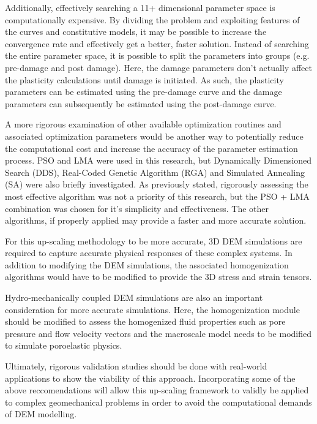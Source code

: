 Additionally, effectively searching a 11+ dimensional parameter space is computationally expensive. By dividing the problem and exploiting features of the curves and constitutive models, it may be possible to increase the convergence rate and effectively get a better, faster solution. Instead of searching the entire parameter space, it is possible to split the parameters into groups (e.g. pre-damage and post damage). Here, the damage parameters don't actually affect the plasticity calculations until damage is initiated. As such, the plasticity parameters can be estimated using the pre-damage curve and the damage parameters can subsequently be estimated using the post-damage curve.

A more rigorous examination of other available optimization routines and associated optimization parameters would be another way to potentially reduce the computational cost and increase the accuracy of the parameter estimation process. PSO and LMA were used in this research, but Dynamically Dimensioned Search (DDS), 
Real-Coded Genetic Algorithm (RGA) and Simulated Annealing (SA) were also briefly investigated. As previously stated, rigorously assessing the most effective algorithm was not a priority of this research, but the PSO + LMA combination was chosen for it's simplicity and effectiveness. The other algorithms, if properly applied may provide a faster and more accurate solution.
	
For this up-scaling methodology to be more accurate, 3D DEM simulations are required to capture accurate physical responses of these complex systems. In addition to modifying the DEM simulations, the associated homogenization algorithms would have to be modified to provide the 3D stress and strain tensors. 

Hydro-mechanically coupled DEM simulations are also an important consideration for more accurate simulations. Here, the homogenization module should be modified to assess the homogenized fluid properties such as pore pressure and flow velocity vectors and the macroscale model needs to be modified to simulate poroelastic physics.

Ultimately, rigorous validation studies should be done with real-world applications to show the viability of this approach. Incorporating some of the above reccomendations will allow this up-scaling framework to validly be applied to complex geomechanical problems in order to avoid the computational demands of DEM modelling. 